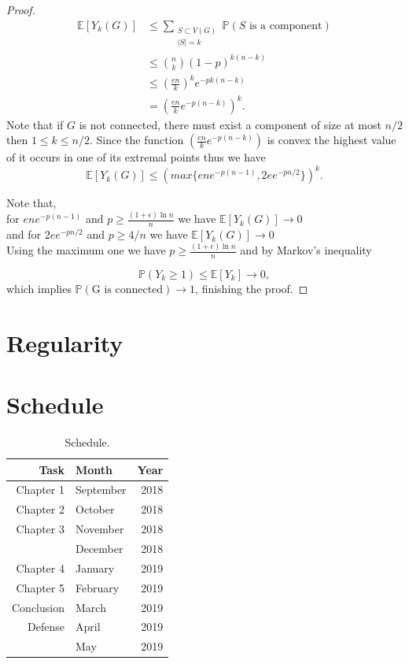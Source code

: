 \documentclass[12pt,twoside,a4paper]{book}
\numberwithin{equation}{section}
\let\log=\ln
\theoremstyle{remark}
\begin{document}
\begin{proof}
\begin{align*}
\mathbb{E}[Y_k (G)]  & \leq \sum_{\substack{S\subset V(G) \\ |S| = k}} \mathbb{P}(S\text{ is a component})\\
&\leq \binom{n}{k}(1-p)^{k(n-k)}\\
&\leq \left( \frac{en}{k} \right) ^k e^{-pk(n-k)}\\
& = \left( \frac{en}{k} e^{-p(n-k)} \right)^k.
\end{align*}
Note that if $G$ is not connected, there must exist a component of size at most $ n/2$ then $1 \leq k \leq n/2$. Since the function $\left( \frac{en}{k} e^{-p(n-k)} \right)$ is convex the highest value of it occurs in one of its extremal points thus we have
$$\mathbb{E}[Y_k (G)] \leq (max\{ene^{-p(n-1)}, 2ee^{-pn/2}\})^k .$$

Note that, \\
for $ene^{-p(n-1)}$ and $p \geq \frac{(1 + \epsilon) \log n}{n}$ we have $\mathbb{E}[Y_k (G)] \rightarrow 0$\\
and for $2ee^{-pn/2}$ and $p \geq 4/n$ we have $\mathbb{E}[Y_k (G)] \rightarrow 0$\\

Using the maximum one we have $p \geq \frac{(1 + \epsilon) \log n}{n}$  and by Markov's inequality

 $$\mathbb{P}(Y_k \geq 1) \leq \mathbb{E}[Y_k] \rightarrow 0,$$
 which implies $\mathbb{P}(\text{G is connected}) \rightarrow 1$, finishing the proof.

\end{proof}
\chapter{Regularity}

\chapter{Schedule}

\begin{table}[h]
\centering

\begin{tabular}{|r|lr|}
\hline
Task & Month&Year \\ 
\hline                               
Chapter 1& September & 2018 \\
Chapter 2 &October & 2018 \\
Chapter 3&November & 2018 \\
 &December & 2018 \\
Chapter 4&January & 2019 \\
Chapter 5&February & 2019 \\
Conclusion&March & 2019 \\
Defense&April & 2019 \\
 &May & 2019   \\ 
\hline
\end{tabular}
\caption{Schedule.}
\label{tab:schedule}
\end{table}
\end{document}
